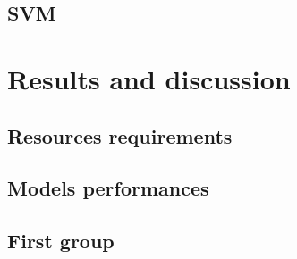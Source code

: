 \subsection{SVM}

\section{Results and discussion}
\label{subsec:results}

\subsection{Resources requirements}

\subsection{Models performances}

\subsection{First group}

